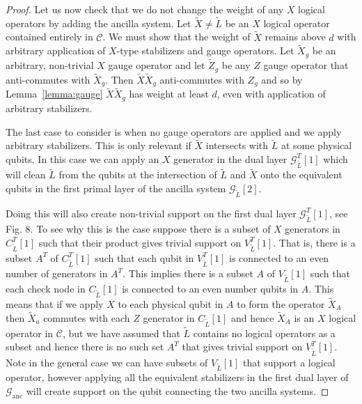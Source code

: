 \documentclass[reprint,
superscriptaddress,
 amsmath,amssymb,
 aps, longbibliography
]{revtex4-1}
\newcommand{\rev}[1]{{#1}}
\begin{document}
\begin{proof}
Let us now check that we do not change the weight of any $X$ logical operators by adding the ancilla system. Let $\tilde{X} \not= \tilde{L}$ be an $X$ logical operator contained entirely in $\mathcal{C}$. We must show that the weight of $\tilde{X}$ remains above $d$ with arbitrary application of $X$-type stabilizers and gauge operators. Let $\tilde{X}_g$ be an arbitrary, non-trivial $X$ gauge operator and let $\tilde{Z}_g$ be any $Z$ gauge operator that anti-commutes with $\tilde{X}_g$. Then $\tilde{X}\tilde{X}_g$ anti-commutes with $Z_g$ and so by Lemma~\ref{lemma:gauge} $\tilde{X} \tilde{X}_g$ has weight at least $d$, even with application of arbitrary stabilizers. 

The last case to consider is when no gauge operators are applied and we apply arbitrary stabilizers. This is only relevant if $\tilde{X}$ intersects with $\tilde{L}$ at some physical qubits. In this case we can apply an $X$ generator in the dual layer $\mathcal{G}^T_{\tilde{L}}[1]$ which will \rev{clean $\tilde{L}$ from the qubits at the intersection of $\tilde{L}$ and $\tilde{X}$ onto the equivalent qubits in the first primal layer of the ancilla system $\mathcal{G}_{\tilde{L}}[2]$}.

Doing this will also create non-trivial support on the first dual layer $\mathcal{G}^T_{\tilde{L}}[1]$, \rev{see Fig. 8}. To see why this is the case suppose there is a subset of $X$ generators in $C^T_{\tilde{L}}[1]$ such that their product gives trivial support on $V^T_{\tilde{L}}[1]$. That is, there is a subset $A^T$ of $C^T_{\tilde{L}}[1]$ such that each qubit in $V^T_{\tilde{L}}[1]$ is connected to an even number of generators in $A^T$. This implies there is a subset $A$ of $V_{\tilde{L}}[1]$ such that each check node in $C_{\tilde{L}}[1]$ is connected to an even number qubits in $A$. This means that if we apply $X$ to each physical qubit in $A$ to form the operator $\tilde{X}_A$ then $\tilde{X}_a$ commutes with each $Z$ generator in $C_{\tilde{L}}[1]$ and hence $\tilde{X}_A$ is an $X$ logical operator in $\mathcal{C}$, but we have assumed that $\tilde{L}$ contains no logical operators as a subset and hence there is no such set $A^T$ that gives trivial support on $V^T_{\tilde{L}}[1]$. Note in the general case we can have subsets of $V_{\tilde{L}}[1]$ that support a logical operator, however applying all the equivalent stabilizers in the first dual layer of $\mathcal{G}_{\textrm{anc}}$ will create support on the qubit connecting the two ancilla systems. 


\end{proof}
\end{document}
